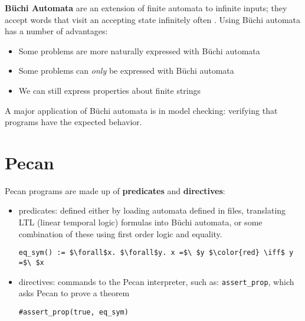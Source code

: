 \documentclass[10pt,usenames,dvipsnames]{article}
\begin{document}


\textbf{B\"uchi Automata} are an extension of finite automata to infinite inputs; they accept words that visit an accepting state infinitely often \cite{aut_theory}. 
Using B\"uchi automata has a number of advantages:
\begin{itemize}
        \item Some problems are more naturally expressed with B\"uchi automata
        \item Some problems can \emph{only} be expressed with B\"uchi automata
        \item We can still express properties about finite strings
\end{itemize}
A major application of B\"uchi automata is in model checking: verifying that programs have the expected behavior.

\section{Pecan}

Pecan programs are made up of \textbf{predicates} and \textbf{directives}:

\begin{itemize}
    \item predicates: defined either by loading automata defined in files, translating LTL (linear temporal logic) formulas into B\"uchi automata, or some combination of these using first order logic and equality.

\begin{lstlisting}[language=pecan, basicstyle=\normalsize\ttfamily, mathescape=true, frame=single]
eq_sym() := $\forall$x. $\forall$y. x =$\ $y $\color{red} \iff$ y =$\ $x
\end{lstlisting}

    \item directives: commands to the Pecan interpreter, such as: \texttt{assert\_prop}, which asks Pecan to prove a theorem
    
\begin{lstlisting}[language=pecan, basicstyle=\normalsize\ttfamily, mathescape=true, frame=single]
#assert_prop(true, eq_sym)
\end{lstlisting}

\end{itemize}
\end{document}

